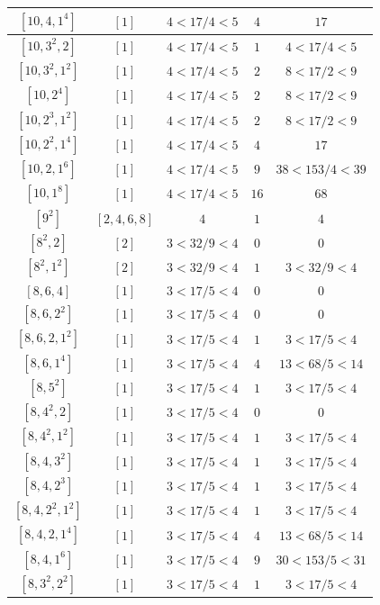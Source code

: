 \documentclass{article}%
\begin{document}
\begin{center}
\begin{longtable}{||c|c|c|c|c||}
$[10, 4, 1^{4}]$ & $[1]$ & $4 < 17/4 < 5$ & $4$ & $17$ \\ \hline 
$[10, 3^{2}, 2]$ & $[1]$ & $4 < 17/4 < 5$ & $1$ & $4 < 17/4 < 5$ \\ \hline 
$[10, 3^{2}, 1^{2}]$ & $[1]$ & $4 < 17/4 < 5$ & $2$ & $8 < 17/2 < 9$ \\ \hline 
$[10, 2^{4}]$ & $[1]$ & $4 < 17/4 < 5$ & $2$ & $8 < 17/2 < 9$ \\ \hline 
$[10, 2^{3}, 1^{2}]$ & $[1]$ & $4 < 17/4 < 5$ & $2$ & $8 < 17/2 < 9$ \\ \hline 
$[10, 2^{2}, 1^{4}]$ & $[1]$ & $4 < 17/4 < 5$ & $4$ & $17$ \\ \hline 
$[10, 2, 1^{6}]$ & $[1]$ & $4 < 17/4 < 5$ & $9$ & $38 < 153/4 < 39$ \\ \hline 
$[10, 1^{8}]$ & $[1]$ & $4 < 17/4 < 5$ & $16$ & $68$ \\ \hline 
$[9^{2}]$ & $[2, 4, 6, 8]$ & $4$ & $1$ & $4$ \\ \hline 
$[8^{2}, 2]$ & $[2]$ & $3 < 32/9 < 4$ & $0$ & $0$ \\ \hline 
$[8^{2}, 1^{2}]$ & $[2]$ & $3 < 32/9 < 4$ & $1$ & $3 < 32/9 < 4$ \\ \hline 
$[8, 6, 4]$ & $[1]$ & $3 < 17/5 < 4$ & $0$ & $0$ \\ \hline 
$[8, 6, 2^{2}]$ & $[1]$ & $3 < 17/5 < 4$ & $0$ & $0$ \\ \hline 
$[8, 6, 2, 1^{2}]$ & $[1]$ & $3 < 17/5 < 4$ & $1$ & $3 < 17/5 < 4$ \\ \hline 
$[8, 6, 1^{4}]$ & $[1]$ & $3 < 17/5 < 4$ & $4$ & $13 < 68/5 < 14$ \\ \hline 
$[8, 5^{2}]$ & $[1]$ & $3 < 17/5 < 4$ & $1$ & $3 < 17/5 < 4$ \\ \hline 
$[8, 4^{2}, 2]$ & $[1]$ & $3 < 17/5 < 4$ & $0$ & $0$ \\ \hline 
$[8, 4^{2}, 1^{2}]$ & $[1]$ & $3 < 17/5 < 4$ & $1$ & $3 < 17/5 < 4$ \\ \hline 
$[8, 4, 3^{2}]$ & $[1]$ & $3 < 17/5 < 4$ & $1$ & $3 < 17/5 < 4$ \\ \hline 
$[8, 4, 2^{3}]$ & $[1]$ & $3 < 17/5 < 4$ & $1$ & $3 < 17/5 < 4$ \\ \hline 
$[8, 4, 2^{2}, 1^{2}]$ & $[1]$ & $3 < 17/5 < 4$ & $1$ & $3 < 17/5 < 4$ \\ \hline 
$[8, 4, 2, 1^{4}]$ & $[1]$ & $3 < 17/5 < 4$ & $4$ & $13 < 68/5 < 14$ \\ \hline 
$[8, 4, 1^{6}]$ & $[1]$ & $3 < 17/5 < 4$ & $9$ & $30 < 153/5 < 31$ \\ \hline 
$[8, 3^{2}, 2^{2}]$ & $[1]$ & $3 < 17/5 < 4$ & $1$ & $3 < 17/5 < 4$ \\ \hline 

\end{longtable}
\end{center}
\end{document}
